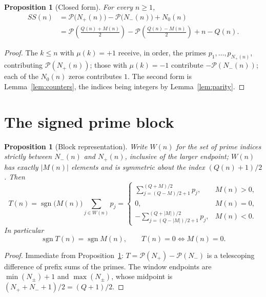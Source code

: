 \documentclass[11pt]{amsart}
\numberwithin{equation}{section}
\theoremstyle{plain}
\newtheorem{proposition}[theorem]{Proposition}
\theoremstyle{definition}
\theoremstyle{remark}
\newcommand{\mob}{\mu}
\newcommand{\Mert}{M}
\newcommand{\Sq}{Q}
\newcommand{\PS}{\mathcal P}
\begin{document}
\begin{proposition}[Closed form]\label{prop:closed}
For every $n\ge1$,
\begin{equation}
\label{eq:closed-form}
\boxed{\begin{aligned}
SS(n)&=\PS\bigl(N_+(n)\bigr)-\PS\bigl(N_-(n)\bigr)+N_0(n)\\
&=\PS\!\left(\frac{\Sq(n)+\Mert(n)}2\right)
-\PS\!\left(\frac{\Sq(n)-\Mert(n)}2\right)+n-\Sq(n).
\end{aligned}}
\end{equation}
\end{proposition}

\begin{proof}
The $k\le n$ with $\mob(k)=+1$ receive, in order, the primes
$p_1,\dots,p_{N_+(n)}$, contributing $\PS(N_+(n))$; those with $\mob(k)=-1$
contribute $-\PS(N_-(n))$; each of the $N_0(n)$ zeros contributes $1$. The
second form is Lemma~\ref{lem:counters}, the indices being integers by
Lemma~\ref{lem:parity}.
\end{proof}

\section{The signed prime block}
\label{sec:block}

\begin{proposition}[Block representation]\label{prop:block}
Write $W(n)$ for the set of prime indices strictly between $N_-(n)$ and
$N_+(n)$, inclusive of the larger endpoint; $W(n)$ has exactly $|\Mert(n)|$
elements and is symmetric about the index $(\Sq(n)+1)/2$. Then
\begin{equation}
\label{eq:block-representation}
T(n)=\operatorname{sgn}\bigl(\Mert(n)\bigr)\sum_{j\in W(n)}p_j
=
\begin{cases}
\displaystyle\sum_{j=(\Sq-\Mert)/2+1}^{(\Sq+\Mert)/2}p_j, & \Mert(n)>0,\\[5mm]
0,& \Mert(n)=0,\\[2mm]
\displaystyle-\sum_{j=(\Sq-|\Mert|)/2+1}^{(\Sq+|\Mert|)/2}p_j, & \Mert(n)<0 .
\end{cases}
\end{equation}
In particular
\begin{equation}
\label{eq:block-sign}
\operatorname{sgn}T(n)=\operatorname{sgn}\Mert(n),
\qquad
T(n)=0\iff \Mert(n)=0 .
\end{equation}
\end{proposition}

\begin{proof}
Immediate from Proposition~\ref{prop:closed}: $T=\PS(N_+)-\PS(N_-)$ is a
telescoping difference of prefix sums of the primes. The window endpoints are
$\min(N_\pm)+1$ and $\max(N_\pm)$, whose midpoint is
$(N_++N_-+1)/2=(\Sq+1)/2$.
\end{proof}
\end{document}
